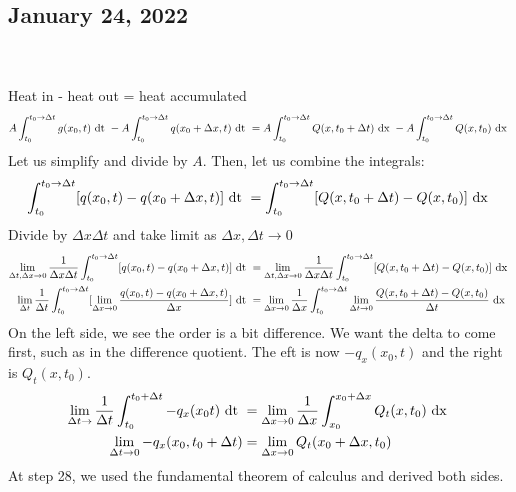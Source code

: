 \documentclass{article}
\begin{document}
\subsection*{January 24, 2022}
\\
\\
Heat in - heat out = heat accumulated
\begin{align}
  A \int^{t_0 \rightarrow \Delta t}_{t_0} g(x_0, t) \text{ dt } -
  A \int^{t_0 \rightarrow \Delta t}_{t_0} q(x_0 + \Delta x, t) \text{ dt } =
  A \int^{t_0 \rightarrow \Delta t}_{t_0} Q(x, t_0 + \Delta t) \text{ dx } -
  A \int^{t_0 \rightarrow \Delta t}_{t_0} Q(x, t_0) \text{ dx }
\end{align}
Let us simplify and divide by $A$. Then, let us combine the integrals:
\begin{align}
  \int^{t_0 \rightarrow \Delta t}_{t_0} [q(x_0, t) - q(x_0 + \Delta x, t)] \text{ dt } =
  \int^{t_0 \rightarrow \Delta t}_{t_0} [Q(x, t_0 + \Delta t) - Q(x, t_0)] \text{ dx }
\end{align}
Divide by $\Delta x \Delta t$ and take limit as $\Delta x, \Delta t \rightarrow 0$
\begin{align}
  \lim_{\Delta t, \Delta x \rightarrow 0} \frac{1}{\Delta x \Delta t}
  \int^{t_0 \rightarrow \Delta t}_{t_0} [q(x_0, t) - q(x_0 + \Delta x, t)] \text{ dt } & =
  \lim_{\Delta t, \Delta x \rightarrow 0} \frac{1}{\Delta x \Delta t}
  \int^{t_0 \rightarrow \Delta t}_{t_0} [Q(x, t_0 + \Delta t) - Q(x, t_0)] \text{ dx }\\
  \lim_{\Delta t} \frac{1}{\Delta t} \int^{t_0 \rightarrow \Delta t}_{t_0} [\lim_{\Delta x \rightarrow 0} \frac{q(x_0, t) - q(x_0 + \Delta x, t)}{\Delta x}] \text{ dt } & =
  \lim_{\Delta x \rightarrow 0} \frac{1}{\Delta x}
  \int^{t_0 \rightarrow \Delta t}_{t_0} \lim_{\Delta t \rightarrow 0} \frac
  {Q(x, t_0 + \Delta t) - Q(x, t_0)}{\Delta t} \text{ dx }
\end{align}
On the left side, we see the order is a bit difference. We want the delta to come first, such as in the difference quotient. The eft is now $-q_x(x_0, t)$ and the right is $Q_t(x, t_0)$.
\begin{align}
  \lim_{\Delta t \rightarrow} \frac{1}{\Delta t} \int^{t_0 + \Delta t}_{t_0} - q_x(x_0 t) \text{ dt } & =
  \lim_{\Delta x \rightarrow 0} \frac{1}{\Delta x} \int^{x_0 + \Delta x}_{x_0} Q_t(x, t_0) \text{ dx }\\
  \lim_{\Delta t \rightarrow 0} -q_x(x_0, t_0 + \Delta t) & = \lim_{\Delta x \rightarrow 0} Q_t(x_0 + \Delta x, t_0)
\end{align}
At step 28, we used the fundamental theorem of calculus and derived both sides.
\end{document}
